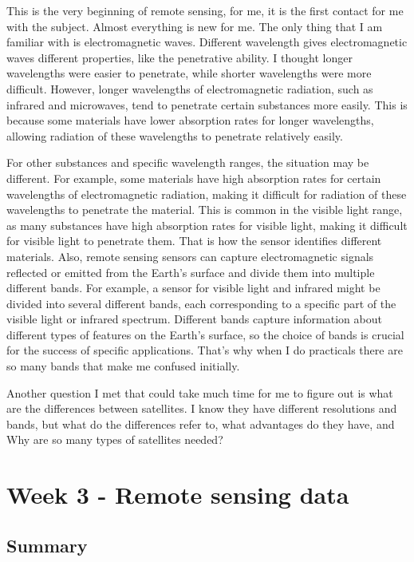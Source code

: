 \documentclass[
  letterpaper,
  DIV=11,
  numbers=noendperiod]{scrreprt}
\begin{document}
This is the very beginning of remote sensing, for me, it is the first
contact for me with the subject. Almost everything is new for me. The
only thing that I am familiar with is electromagnetic waves. Different
wavelength gives electromagnetic waves different properties, like the
penetrative ability. I thought longer wavelengths were easier to
penetrate, while shorter wavelengths were more difficult. However,
longer wavelengths of electromagnetic radiation, such as infrared and
microwaves, tend to penetrate certain substances more easily. This is
because some materials have lower absorption rates for longer
wavelengths, allowing radiation of these wavelengths to penetrate
relatively easily.

For other substances and specific wavelength ranges, the situation may
be different. For example, some materials have high absorption rates for
certain wavelengths of electromagnetic radiation, making it difficult
for radiation of these wavelengths to penetrate the material. This is
common in the visible light range, as many substances have high
absorption rates for visible light, making it difficult for visible
light to penetrate them. That is how the sensor identifies different
materials. Also, remote sensing sensors can capture electromagnetic
signals reflected or emitted from the Earth's surface and divide them
into multiple different bands. For example, a sensor for visible light
and infrared might be divided into several different bands, each
corresponding to a specific part of the visible light or infrared
spectrum. Different bands capture information about different types of
features on the Earth's surface, so the choice of bands is crucial for
the success of specific applications. That's why when I do practicals
there are so many bands that make me confused initially.

Another question I met that could take much time for me to figure out is
what are the differences between satellites. I know they have different
resolutions and bands, but what do the differences refer to, what
advantages do they have, and Why are so many types of satellites needed?


\hypertarget{week-3---remote-sensing-data}{%
\chapter{Week 3 - Remote sensing
data}\label{week-3---remote-sensing-data}}

\hypertarget{summary-1}{%
\section{Summary}\label{summary-1}}
\end{document}
